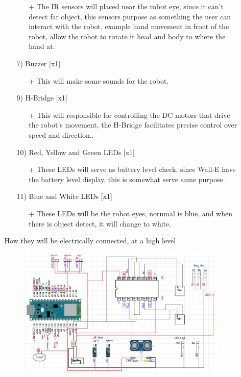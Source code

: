 \documentclass[12pt]{article}
\begin{document}
\begin{itemize}
\begin{itemize}
\begin{itemize}
            \begin{itemize}
                \item[+] The IR sensors will placed near the robot eye, since it can't detect far object, this sensors purpose as something the user can interact with the robot, example hand movement in front of the robot, allow the robot to rotate it head and body to where the hand at.
            \end{itemize}
            \item[7)] Buzzer [x1]
            \begin{itemize}
                \item[+] This will make some sounds for the robot.
            \end{itemize}
            \item[9)] H-Bridge [x1]
            \begin{itemize}
                \item[+] This will responsible for controlling the DC motors that drive the robot’s movement, the H-Bridge facilitates precise control over speed and direction..
            \end{itemize}
            \item[10)] Red, Yellow and Green LEDs [x1]
            \begin{itemize}
                \item[+] These LEDs will serve as battery level check, since Wall-E have the battery level display, this is somewhat serve same purpose.
            \end{itemize}
            \item[11)] Blue and White LEDs [x1]
            \begin{itemize}
                \item[+] These LEDs will be the robot eyes, nornmal is blue, and when there is object detect, it will change to white.
            \end{itemize}
        \end{itemize}
        How they will be electrically connected, at a high level
        \begin{figure}[H]
            \centering
            \includegraphics[width=500pt]{Project-1.jpg}

\end{figure}
\end{itemize}
\end{itemize}
\end{document}
